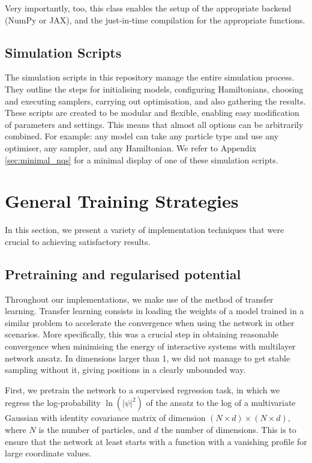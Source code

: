 Very importantly, too, this class enables the setup of the appropriate backend (NumPy or JAX), and the just-in-time compilation for the appropriate functions. 

\subsection{Simulation Scripts}

The simulation scripts in this repository manage the entire simulation process. They outline the steps for initialising models, configuring Hamiltonians, choosing and executing samplers, carrying out optimisation, and also gathering the results. These scripts are created to be modular and flexible, enabling easy modification of parameters and settings. This means that almost all options can be arbitrarily combined. For example: any model can take any particle type and use any optimiser, any sampler, and any Hamiltonian. We refer to Appendix \ref{sec:minimal_nqs} for a minimal display of one of these simulation scripts.




\section{General Training Strategies}

In this section, we present a variety of implementation techniques that were crucial to achieving satisfactory results.

\subsection{Pretraining and regularised potential}\label{sec:pretrain}

Throughout our implementations, we make use of the method of transfer learning. Transfer learning consists in loading the weights of a model trained in a similar problem to accelerate the convergence when using the network in other scenarios. More specifically, this was a crucial step in obtaining reasonable convergence when minimising the energy of interactive systems with multilayer network ansatz. In dimensions larger than 1, we did not manage to get stable sampling without it, giving positions in a clearly unbounded way.

First, we pretrain the network to a supervised regression task, in which we regress the log-probability $\ln(|\psi|^2)$ of the ansatz to the log of a multivariate Gaussian with identity covariance matrix of dimension $(N\times d) \times (N\times d)$, where $N$ is the number of particles, and $d$ the number of dimensions. This is to ensure that the network at least starts with a function with a vanishing profile for large coordinate values.

